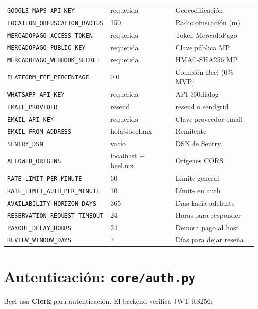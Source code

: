 \documentclass[12pt,a4paper]{report}
\begin{document}
\begin{longtable}{L{5.5cm} L{3.5cm} L{3.5cm}}
\texttt{GOOGLE\_MAPS\_API\_KEY} & requerida & Geocodificaci\'on \\
\texttt{LOCATION\_OBFUSCATION\_RADIUS} & 150 & Radio ofuscaci\'on (m) \\
\texttt{MERCADOPAGO\_ACCESS\_TOKEN} & requerida & Token MercadoPago \\
\texttt{MERCADOPAGO\_PUBLIC\_KEY} & requerida & Clave p\'ublica MP \\
\texttt{MERCADOPAGO\_WEBHOOK\_SECRET} & requerida & HMAC-SHA256 MP \\
\texttt{PLATFORM\_FEE\_PERCENTAGE} & 0.0 & Comisi\'on Beel (0\% MVP) \\
\texttt{WHATSAPP\_API\_KEY} & requerida & API 360dialog \\
\texttt{EMAIL\_PROVIDER} & resend & resend o sendgrid \\
\texttt{EMAIL\_API\_KEY} & requerida & Clave proveedor email \\
\texttt{EMAIL\_FROM\_ADDRESS} & hola@beel.mx & Remitente \\
\texttt{SENTRY\_DSN} & vac\'io & DSN de Sentry \\
\texttt{ALLOWED\_ORIGINS} & localhost + beel.mx & Or\'igenes CORS \\
\texttt{RATE\_LIMIT\_PER\_MINUTE} & 60 & L\'imite general \\
\texttt{RATE\_LIMIT\_AUTH\_PER\_MINUTE} & 10 & L\'imite en auth \\
\texttt{AVAILABILITY\_HORIZON\_DAYS} & 365 & D\'ias hacia adelante \\
\texttt{RESERVATION\_REQUEST\_TIMEOUT} & 24 & Horas para responder \\
\texttt{PAYOUT\_DELAY\_HOURS} & 24 & Demora pago al host \\
\texttt{REVIEW\_WINDOW\_DAYS} & 7 & D\'ias para dejar rese\~na \\
\bottomrule
\end{longtable}

\section{Autenticaci\'on: \texttt{core/auth.py}}

Beel usa \textbf{Clerk} para autenticaci\'on. El backend verifica JWT RS256:
\end{document}
